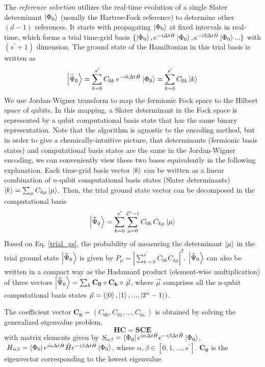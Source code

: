 \documentclass[journal=jctcce,manuscript=article]{achemso}
\begin{document}
The \textit{reference selection} utilizes the real-time evolution of a single Slater determinant $\left\vert{\Phi_0}\right\rangle$ (usually the Hartree-Fock reference) to determine other $(d-1)$ references.
It starts with propagating $\left\vert{\Phi_0}\right\rangle$ at fixed intervals in real-time, which forms a trial time-grid basis $\{\left\vert{\Phi_0}\right\rangle, e^{-i\Delta t \hat{H}} \left\vert{\Phi_0}\right\rangle, e^{-i2\Delta t \hat{H}} \left\vert{\Phi_0}\right\rangle...\}$ with $(s^{\prime}+1)$ dimension.
The ground state of the Hamiltonian in this trial basis is written as
\begin{equation}
\left\vert{\widetilde{\Psi}_{0}}\right\rangle = \sum_{k=0}^{s^{\prime}} C_{0 k} \, e^{-i k \Delta t \hat{H}} \left\vert{\Phi_{0}}\right\rangle
= \sum_{k=0}^{s^{\prime}} C_{0 k}  \left\vert{k}\right\rangle
\end{equation}
We use Jordan-Wigner transform\cite{jordan1993paulische} to map the fermionic Fock space to the Hilbert space of qubits.\cite{whitfield2011simulation} In this mapping, a Slater determinant in the Fock space is represented by a qubit computational basis state that has the same binary representation. Note that the algorithm is agnostic to the encoding method, but in order to give a chemically-intuitive picture, that determinants (fermionic basis states) and computational basis states are the same in the Jordan-Wigner encoding, we can conveniently view these two bases equivalently in the following explanation.
Each time-grid basis vector $\left\vert{k}\right\rangle$ can be written as a linear combination of $n$-qubit computational basis states (Slater determinants) $\left\vert{k}\right\rangle = \sum_{\mu} C_{k \mu} \left\vert{\mu}\right\rangle$. Then, the trial ground state vector can be decomposed in the computational basis
\begin{equation}
\label{trial_gs}
\left\vert{\widetilde{\Psi}_{0}}\right\rangle = \sum_{k=0}^{s^{\prime}} \sum_{\mu=0}^{2^{n}-1}  C_{0 k} \, C_{k \mu} \left\vert{\mu}\right\rangle 
\end{equation}
Based on Eq. \ref{trial_gs}, the probability of measuring the determinant $\left\vert{\mu}\right\rangle$ in the trial ground state $\left\vert{\widetilde{\Psi}_{0}}\right\rangle$ is given by $P_{\mu}=|\sum_{k=0}^{s^{\prime}} C_{0 k} C_{k \mu}|^{2}$.
$\left\vert{\widetilde{\Psi}_{0}}\right\rangle$ can also be written in a compact way as the Hadamard product\cite{horn2012matrix} (element-wise multiplication) of three vectors $\left\vert{\widetilde{\Psi}_{0}}\right\rangle = \sum_{k} \mathbf{C_{0}}  \circ  \mathbf{C_{k }}   \circ \,  \vec{\mu}$,
where $\vec{\mu}$ comprises all the n-qubit computational basis states $\vec{\mu} = (\left\vert{0}\right\rangle, \left\vert{1}\right\rangle, ... ,\left\vert{2^{n}-1}\right\rangle)$.

The coefficient vector $\mathbf{C_{0}} = (C_{00}, C_{01}, ... , C_{0s^{\prime}} )$ is obtained by solving the generalized eigenvalue problem,
\begin{equation}
\label{ge}
\mathbf{HC} = \mathbf{SCE}
\end{equation}
with matrix elements given by 
$S_{\alpha \beta} = \left\langle{\Phi_0}\right\vert e^{i \alpha \Delta t \hat{H}} e^{-i \beta \Delta t \hat{H}} \left\vert{\Phi_0}\right\rangle $,
$\ H_{\alpha \beta} = \left\langle{\Phi_0}\right\vert e^{i \alpha \Delta t \hat{H}}  \hat{H}   e^{-i \beta \Delta t \hat{H}}  \left\vert{\Phi_0}\right\rangle$,
where $\alpha, \beta \in [0,1,...,s^{\prime}]$. $\mathbf{C_{0}}$ is the eigenvector corresponding to the lowest eigenvalue.
\end{document}
